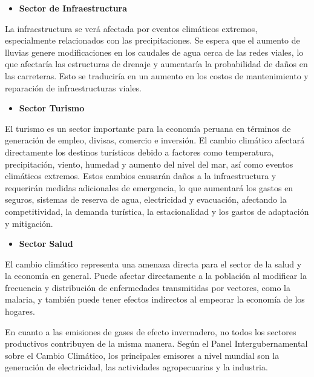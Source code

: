 \documentclass[
  a4paper,
]{article}
\providecommand{\tightlist}{%
  \setlength{\itemsep}{0pt}\setlength{\parskip}{0pt}}\usepackage{longtable,booktabs,array}
\begin{document}
\begin{itemize}
\tightlist
\item
  \textbf{Sector de Infraestructura}
\end{itemize}

La infraestructura se verá afectada por eventos climáticos extremos,
especialmente relacionados con las precipitaciones. Se espera que el
aumento de lluvias genere modificaciones en los caudales de agua cerca
de las redes viales, lo que afectaría las estructuras de drenaje y
aumentaría la probabilidad de daños en las carreteras. Esto se
traduciría en un aumento en los costos de mantenimiento y reparación de
infraestructuras viales.

\begin{itemize}
\tightlist
\item
  \textbf{Sector Turismo}
\end{itemize}

El turismo es un sector importante para la economía peruana en términos
de generación de empleo, divisas, comercio e inversión. El cambio
climático afectará directamente los destinos turísticos debido a
factores como temperatura, precipitación, viento, humedad y aumento del
nivel del mar, así como eventos climáticos extremos. Estos cambios
causarán daños a la infraestructura y requerirán medidas adicionales de
emergencia, lo que aumentará los gastos en seguros, sistemas de reserva
de agua, electricidad y evacuación, afectando la competitividad, la
demanda turística, la estacionalidad y los gastos de adaptación y
mitigación.

\begin{itemize}
\tightlist
\item
  \textbf{Sector Salud}
\end{itemize}

El cambio climático representa una amenaza directa para el sector de la
salud y la economía en general. Puede afectar directamente a la
población al modificar la frecuencia y distribución de enfermedades
transmitidas por vectores, como la malaria, y también puede tener
efectos indirectos al empeorar la economía de los hogares.

En cuanto a las emisiones de gases de efecto invernadero, no todos los
sectores productivos contribuyen de la misma manera. Según el Panel
Intergubernamental sobre el Cambio Climático, los principales emisores a
nivel mundial son la generación de electricidad, las actividades
agropecuarias y la industria.
\end{document}

